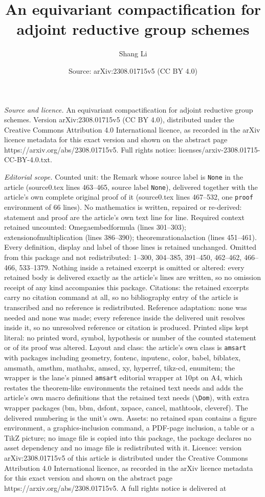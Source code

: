 \documentclass[10pt,a4paper]{amsart}
\title[An equivariant compactification for adjoint reductive group ]{An equivariant compactification for adjoint reductive group schemes}
\author{Shang Li}
\date{Source: arXiv:2308.01715v5 (CC BY 4.0)}
\begin{document}
\maketitle

\noindent\emph{Source and licence.} An equivariant compactification for adjoint reductive group schemes. Version arXiv:2308.01715v5 (CC BY 4.0), distributed under the Creative Commons Attribution 4.0 International licence, as recorded in the arXiv licence metadata for this exact version and shown on the abstract page https://arxiv.org/abs/2308.01715v5. Full rights notice: licenses/arxiv-2308.01715-CC-BY-4.0.txt.\par\smallskip

\noindent\textit{Editorial scope.} Counted unit: the Remark whose source label is \texttt{None} in the article (source0.tex lines 463--465, source label \texttt{None}), delivered together with the article's own complete original proof of it (source0.tex lines 467--532, one \texttt{proof} environment of 66 lines). No mathematics is written, repaired or re-derived: statement and proof are the article's own text line for line. Required context retained uncounted: Omegaembedformula (lines 301--303); extensionofmultiplication (lines 386--390); theoremrationalaction (lines 451--461). Every definition, display and label of those lines is retained unchanged. Omitted from this package and not redistributed: 1--300, 304--385, 391--450, 462--462, 466--466, 533--1379. Nothing inside a retained excerpt is omitted or altered: every retained body is delivered exactly as the article's lines are written, so no omission receipt of any kind accompanies this package. Citations: the retained excerpts carry no citation command at all, so no bibliography entry of the article is transcribed and no reference is redistributed. Reference adaptation: none was needed and none was made; every reference inside the delivered unit resolves inside it, so no unresolved reference or citation is produced. Printed slips kept literal: no printed word, symbol, hypothesis or number of the counted statement or of its proof was altered. Layout and class: the article's own class is \texttt{amsart} with packages including geometry, fontenc, inputenc, color, babel, biblatex, amsmath, amsthm, mathabx, amscd, xy, hyperref, tikz-cd, enumitem; the wrapper is the lane's pinned \texttt{amsart} editorial wrapper at 10pt on A4, which restates the theorem-like environments the retained text needs and adds the article's own macro definitions that the retained text needs (\texttt{\textbackslash Dom}), with extra wrapper packages (bm, bbm, dsfont, xspace, cancel, mathtools, cleveref). The delivered numbering is the unit's own. Assets: no retained span contains a figure environment, a graphics-inclusion command, a PDF-page inclusion, a table or a TikZ picture; no image file is copied into this package, the package declares no asset dependency and no image file is redistributed with it. Licence: version arXiv:2308.01715v5 of this article is distributed under the Creative Commons Attribution 4.0 International licence, as recorded in the arXiv licence metadata for this exact version and shown on the abstract page https://arxiv.org/abs/2308.01715v5. A full rights notice is delivered at 
\end{document}
